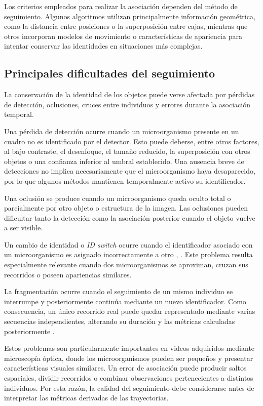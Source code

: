 Los criterios empleados para realizar la asociación dependen del método de seguimiento. Algunos algoritmos utilizan principalmente información geométrica, como la distancia entre posiciones o la superposición entre cajas, mientras que otros incorporan modelos de movimiento o características de apariencia para intentar conservar las identidades en situaciones más complejas.

\subsection{Principales dificultades del seguimiento}

La conservación de la identidad de los objetos puede verse afectada por pérdidas de detección, oclusiones, cruces entre individuos y errores durante la asociación temporal.

Una pérdida de detección ocurre cuando un microorganismo presente en un cuadro no es identificado por el detector. Esto puede deberse, entre otros factores, al bajo contraste, el desenfoque, el tamaño reducido, la superposición con otros objetos o una confianza inferior al umbral establecido. Una ausencia breve de detecciones no implica necesariamente que el microorganismo haya desaparecido, por lo que algunos métodos mantienen temporalmente activo su identificador.

Una oclusión se produce cuando un microorganismo queda oculto total o parcialmente por otro objeto o estructura de la imagen. Las oclusiones pueden dificultar tanto la detección como la asociación posterior cuando el objeto vuelve a ser visible.

Un cambio de identidad o \textit{ID switch} ocurre cuando el identificador asociado con un microorganismo es asignado incorrectamente a otro \cite{wojke2017}, \cite{dendorfer2021}. Este problema resulta especialmente relevante cuando dos microorganismos se aproximan, cruzan sus recorridos o poseen apariencias similares.

La fragmentación ocurre cuando el seguimiento de un mismo individuo se interrumpe y posteriormente continúa mediante un nuevo identificador. Como consecuencia, un único recorrido real puede quedar representado mediante varias secuencias independientes, alterando su duración y las métricas calculadas posteriormente \cite{dendorfer2021}.

Estos problemas son particularmente importantes en videos adquiridos mediante microscopía óptica, donde los microorganismos pueden ser pequeños y presentar características visuales similares. Un error de asociación puede producir saltos espaciales, dividir recorridos o combinar observaciones pertenecientes a distintos individuos. Por esta razón, la calidad del seguimiento debe considerarse antes de interpretar las métricas derivadas de las trayectorias.

